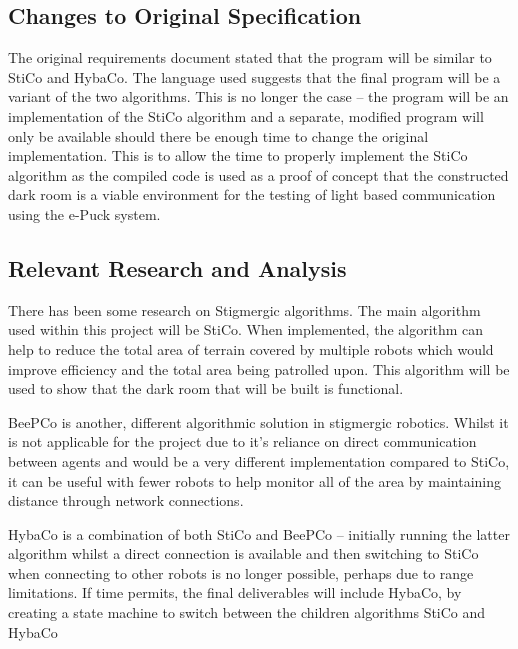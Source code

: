 \subsection{Changes to Original Specification} \label{desReqChanges}
The original requirements document stated that the program will be similar to 
StiCo and HybaCo\cite{myReq}.  The language used suggests that the final
program will be a variant of the two algorithms.  This is no longer the case
-- the program will be an implementation of the StiCo algorithm and a separate,
modified program will only be available should there be enough time to
change the original implementation.  This is to allow the time to properly
implement the StiCo algorithm as the compiled code is used as a proof of
concept that the constructed dark room is a viable environment for the testing
of light based communication using the e-Puck system.

\subsection{Relevant Research and Analysis} \label{desResAnal}
There has been some research on Stigmergic algorithms.  The main algorithm used
within this project will be 
StiCo\cite{Ranjbar-Sahraei2012,Ranjbar-Sahraei2012Demo,Ranjbar-Sahraei2013}.
When implemented, the algorithm can help to reduce the total area of terrain
covered by multiple robots which would improve efficiency and the total area 
being patrolled upon.  This algorithm will be used to show that the dark room
that will be built is functional.

BeePCo is another, different algorithmic solution in stigmergic robotics.  
Whilst it is not applicable for the project due to it's reliance on direct
communication between agents and would be a very different implementation 
compared to StiCo, it can be useful with fewer robots to help monitor all of the
area by maintaining distance through network connections.

HybaCo is a combination of both StiCo and BeePCo -- initially running the latter
algorithm whilst a direct connection is available and then switching to StiCo
when connecting to other robots is no longer possible, perhaps due to range
limitations\cite{Broecker2015}.  If time permits, the final deliverables will 
include HybaCo, by creating a state machine to switch between the children
algorithms StiCo and HybaCo

